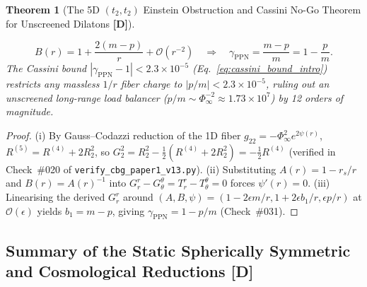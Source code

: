 \documentclass[11pt,a4paper]{article}
\newcommand{\catD}{\textbf{\textcolor{blue!75!black}{[D]}}}
\newtheorem{theorem}{Theorem}[section]
\theoremstyle{definition}
\theoremstyle{remark}
\begin{document}
\begin{theorem}[The 5D $(t_2,t_2)$ Einstein Obstruction and Cassini No-Go Theorem for Unscreened Dilatons \catD]
\begin{enumerate}
  \begin{equation}
    B(r) = 1 + \frac{2\left(m - p\right)}{r} + \mathcal{O}(r^{-2}) \quad \Longrightarrow \quad \gamma_{\text{PPN}} = \frac{m - p}{m} = 1 - \frac{p}{m}.
    \label{eq:gamma_ppn_massless}
  \end{equation}
  The Cassini bound $|\gamma_{\text{PPN}} - 1| < 2.3 \times 10^{-5}$ (Eq.~\ref{eq:cassini_bound_intro}) restricts any massless $1/r$ fiber charge to $|p/m| < 2.3 \times 10^{-5}$, ruling out an unscreened long-range load balancer ($p/m \sim \Phi_{\infty}^{-2} \approx 1.73 \times 10^7$) by 12 orders of magnitude.
\end{enumerate}
\end{theorem}

\begin{proof}
(i) By Gauss--Codazzi reduction of the 1D fiber $g_{22} = -\Phi_{\infty}^2 e^{2\psi(r)}$, $R^{(5)} = R^{(4)} + 2 R^2_2$, so $G^2_2 = R^2_2 - \frac{1}{2}(R^{(4)} + 2 R^2_2) = -\frac{1}{2}R^{(4)}$ (verified in Check~\#020 of \texttt{verify\_cbg\_paper1\_v13.py}). (ii) Substituting $A(r) = 1 - r_s/r$ and $B(r) = A(r)^{-1}$ into $G^r_r - G^{\theta}_{\theta} = T^r_r - T^{\theta}_{\theta} = 0$ forces $\psi'(r) = 0$. (iii) Linearising the derived $G^r_r$ around $(A, B, \psi) = (1 - 2\epsilon m/r, 1 + 2\epsilon b_1/r, \epsilon p/r)$ at $\mathcal{O}(\epsilon)$ yields $b_1 = m - p$, giving $\gamma_{\text{PPN}} = 1 - p/m$ (Check~\#031).
\end{proof}

\subsection{\texorpdfstring{Summary of the Static Spherically Symmetric and Cosmological Reductions \catD}{Summary of the Static Spherically Symmetric and Cosmological Reductions}}
\end{document}
